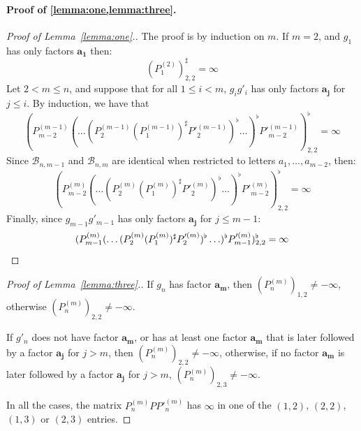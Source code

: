 \documentclass[10pt,a4paper]{amsart}
\theoremstyle{definition}
\numberwithin{equation}{section}
\theoremstyle{remark}
\theoremstyle{remark}
\begin{document}
\paragraph{Proof of \cref{lemma:one,lemma:three}.}
\begin{proof}[Proof of Lemma~\ref{lemma:one}.]
The proof is by induction on $m$.
If $m = 2$, and $g_1$ has only factors $\boldsymbol{a_1}$ then:
$$(P^{(2)}_1)^\sharp_{2,2} = \infty$$
Let $2<m \leq n$, and suppose that for all $1\leq i < m$, $g_ig'_i$ has only factors $\boldsymbol{a_j}$ for $j\leq i$. By induction, we have that 
$$(P^{(m-1)}_{m-2} (\ldots (P^{(m-1)}_2 (P^{(m-1)}_1)^\sharp P'^{(m-1)}_2)^\flat \ldots)^\flat P'^{(m-1)}_{m-2})^\flat_{2,2} = \infty$$
Since $\mathcal{B}_{n,m-1}$ and $\mathcal{B}_{n,m}$ are identical when restricted to letters $a_1, \ldots, a_{m-2}$, then:
$$(P^{(m)}_{m-2} (\ldots (P^{(m)}_2 (P^{(m)}_1)^\sharp P'^{(m)}_2)^\flat \ldots)^\flat P'^{(m)}_{m-2})^\flat_{2,2} = \infty$$
Finally, since $g_{m-1}g'_{m-1}$ has only factors $\boldsymbol{a_j}$ for $j\leq m-1$:
\begin{equation*}(P^{(m)}_{m-1} (\ldots (P^{(m)}_2 (P^{(m)}_1)^\sharp P'^{(m)}_2)^\flat \ldots)^\flat P'^{(m)}_{m-1})^\flat_{2,2} = \infty\qedhere
\end{equation*}
\end{proof}


\begin{proof}[Proof of Lemma~\ref{lemma:three}.]
If $g_{n}$ has factor $\boldsymbol{a_m}$, then $(P^{(m)}_{n})_{1,2} \neq -\infty$, otherwise $(P^{(m)}_{n})_{2,2} \neq -\infty$. 

If $g'_{n}$ does not have factor $\boldsymbol{a_m}$, or has at least one factor $\boldsymbol{a_m}$ that is later followed by a factor $\boldsymbol{a_j}$ for $j>m$, then $(P^{(m)}_{n})_{2,2} \neq -\infty$, otherwise, if no factor $\boldsymbol{a_m}$ is later followed by a factor $\boldsymbol{a_j}$ for $j>m$, $(P^{(m)}_{n})_{2,3} \neq -\infty$. 

In all the cases, the matrix $P^{(m)}_{n} P P'^{(m)}_{n}$ has $\infty$ in one of the $(1,2)$, $(2,2)$, $(1,3)$ or $(2,3)$ entries.
\end{proof}
\end{document}
